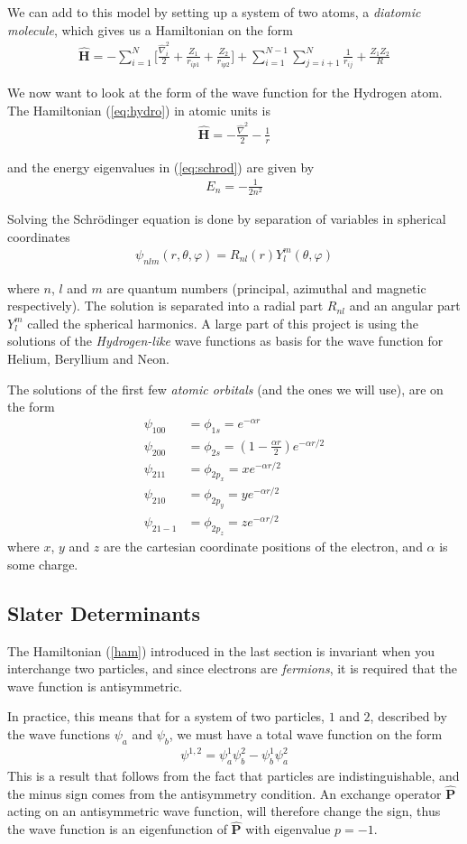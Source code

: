 \documentclass[twocolumns, a4paper,11pt,fleqn]{extarticle}
\newcommand{\eq}[1]{{\small\begin{align*}#1\end{align*}}}
\newcommand{\equ}[1]{{\small\begin{align}#1\end{align}}}
\newcommand{\OP}[1]{\mathbf{\widehat{#1}}}
\newcommand{\op}[1]{\hat{#1}}
\begin{document}
We can add to this model by setting up a system of two atoms,
a \textit{diatomic molecule}, which gives us a Hamiltonian on the form
\eq{
  \OP H = -\sum_{i=1}^N\bigg[
    \frac{\op\nabla_i^2}{2} + \frac{Z_1}{r_{ip1}} + \frac{Z_2}{r_{ip2}}\bigg] 
    + \sum_{i=1}^{N-1}\sum_{j=i+1}^N\frac{1}{r_{ij}} + \frac{Z_1 Z_2}{R}
}

We now want to look at the form of the wave function for the Hydrogen atom.
The Hamiltonian (\ref{eq:hydro}) in atomic units is
\eq{
  \OP H = -\frac{\op \nabla^2}{2}- \frac{1}{r}
}

and the energy eigenvalues in (\ref{eq:schrod}) are given by
\eq{
  E_n = -\frac{1}{2n^2}
}

Solving the Schr\"odinger equation is done by separation of variables in
spherical coordinates
\equ{
  \psi_{nlm}(r,\theta,\varphi) = R_{nl}(r) Y_l^{m}(\theta,\varphi)\label{eq:psi}
}

where $n$, $l$ and $m$ are quantum numbers 
(principal, azimuthal and magnetic respectively).
The solution is separated into a radial part $R_{nl}$ and an angular part $Y_l^{m}$
called the spherical harmonics.
A large part of this project is using the solutions of the \textit{Hydrogen-like}
wave functions as basis for the wave function for Helium, Beryllium and Neon.

The solutions of the first few \textit{atomic orbitals} (and the ones we will use), 
are on the form
\eq{
  \psi_{100} &= \phi_{1s} =  e^{-\alpha r}\\
  \psi_{200} &= \phi_{2s} =  \left(1-\frac{\alpha r}{2}\right)e^{-\alpha r/2} \\
  \psi_{211} &= \phi_{2p_x} = x e^{-\alpha r/2}\\
  \psi_{210} &= \phi_{2p_y} = y e^{-\alpha r/2}\\
  \psi_{21-1}&= \phi_{2p_z} = z e^{-\alpha r/2}
}
where $x$, $y$ and $z$ are the cartesian coordinate positions of the electron,
and $\alpha$ is some charge.

\subsection{Slater Determinants}
The Hamiltonian (\ref{ham}) introduced in the last section is invariant
when you interchange two particles, and since electrons are \textit{fermions},
it is required that the wave function is antisymmetric.

In practice, this means that for a system of two particles, $1$ and $2$, described by the
wave functions $\psi_a$ and $\psi_b$, we must have a total wave function on the form
\equ{
  \psi^{1,2} = \psi_a^1 \psi_b^2 - \psi_b^1 \psi_a^2\label{wavfunc}
}
This is a result that follows from the fact that particles are indistinguishable,
and the minus sign comes from the antisymmetry condition.
An exchange operator $\OP P$ acting on an antisymmetric wave function,
will therefore change the sign, thus the wave function is an eigenfunction
of $\OP P$ with eigenvalue $p=-1$.
\end{document}
